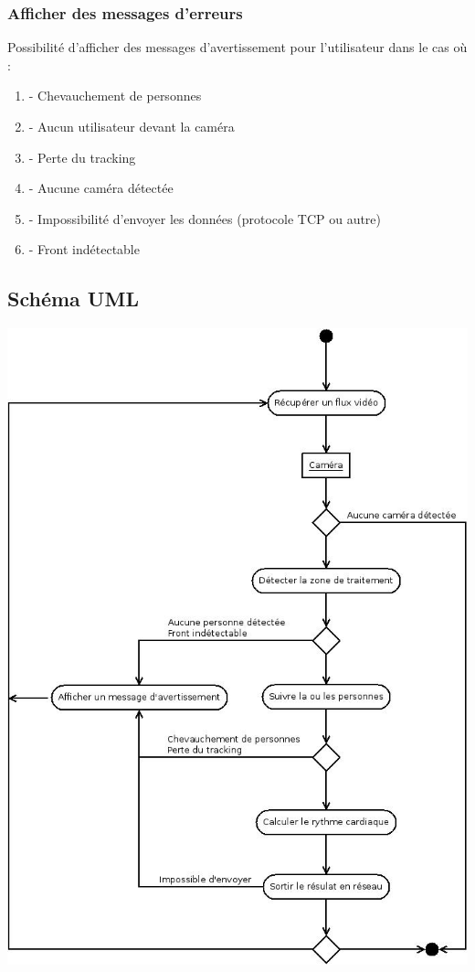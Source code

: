 \documentclass[12pt,a4paper]{article}
\begin{document}
\subsubsection{Afficher des messages d'erreurs}

Possibilité d'afficher des messages d'avertissement pour l'utilisateur dans le cas où :

\begin{enumerate}
\item [] - Chevauchement de personnes
\item [] - Aucun utilisateur devant la caméra
\item [] - Perte du tracking
\item [] - Aucune caméra détectée 
\item [] - Impossibilité d'envoyer les données (protocole TCP ou autre)
\item [] - Front indétectable

\end{enumerate}
\newpage
\subsection{Schéma UML}
\includegraphics[scale=0.5]{uml.jpeg}
\newpage
\end{document}
